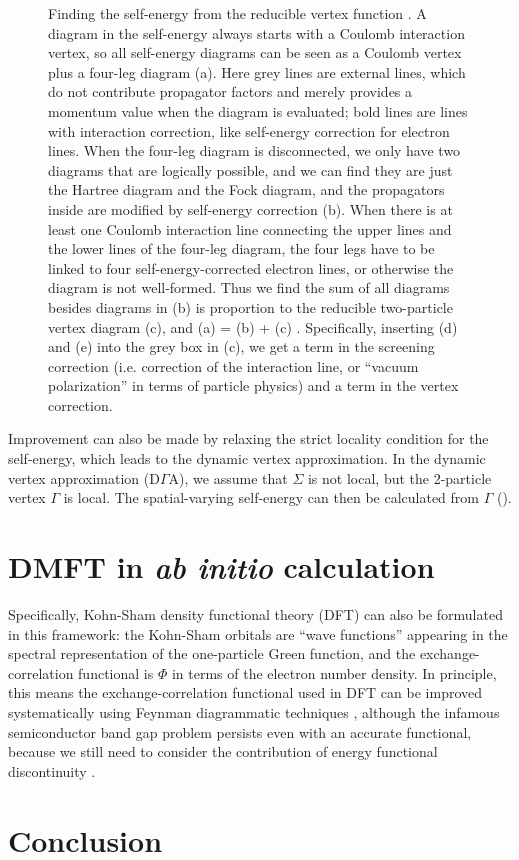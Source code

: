 \documentclass[hyperref, a4paper]{article}
\begin{document}
\begin{figure}
    \centering
    
    \caption{
        Finding the self-energy from the reducible vertex function \cite{bickers1991conserving}.
        A diagram in the self-energy always starts with a Coulomb interaction vertex,
        so all self-energy diagrams can be seen as a Coulomb vertex plus a 
        four-leg diagram (a).
        Here grey lines are external lines, 
        which do not contribute propagator factors and merely provides a momentum value 
        when the diagram is evaluated;
        bold lines are lines with interaction correction,
        like self-energy correction for electron lines.
        When the four-leg diagram is disconnected, we only have two diagrams that are logically possible,
        and we can find they are just the Hartree diagram and the Fock diagram,
        and the propagators inside are modified by self-energy correction (b).
        When there is at least one Coulomb interaction line connecting the upper lines and the lower lines 
        of the four-leg diagram, the four legs have to be linked to four self-energy-corrected electron lines,
        or otherwise the diagram is not well-formed.
        Thus we find the sum of all diagrams besides diagrams in (b) 
        is proportion to the reducible two-particle vertex diagram (c),
        and (a) = (b) + (c) \cite{bickers1991conserving}.
        Specifically, inserting (d) and (e) into the grey box in (c), 
        we get a term in the screening correction 
        (i.e. correction of the interaction line, or ``vacuum polarization'' in terms of particle physics)
        and a term in the vertex correction.
    }
    \label{fig:dga}
\end{figure}

Improvement can also be made by relaxing the strict locality condition for the self-energy,
which leads to the dynamic vertex approximation.
In the dynamic vertex approximation (D$\Gamma$A),
we assume that $\Sigma$ is not local,
but the 2-particle vertex $\Gamma$ is local.
The spatial-varying self-energy can then be calculated from $\Gamma$
(). 

\section{DMFT in \textit{ab initio} calculation}\label{sec:ab-initio}

Specifically, Kohn-Sham density functional theory (DFT) 
can also be formulated in this framework: 
the Kohn-Sham orbitals are ``wave functions'' 
appearing in the spectral representation of the one-particle Green function,
and the exchange-correlation functional 
is $\Phi$ in terms of the electron number density.
In principle, 
this means the exchange-correlation functional used in DFT
can be improved systematically using Feynman diagrammatic techniques
\cite{aryasetiawan2002total,gruning2006density},
although the infamous semiconductor band gap problem
persists even with an accurate functional,
because we still need to consider the contribution of 
energy functional discontinuity
\cite{gruning2006density}.

\section{Conclusion}

\printbibliography
\end{document}
